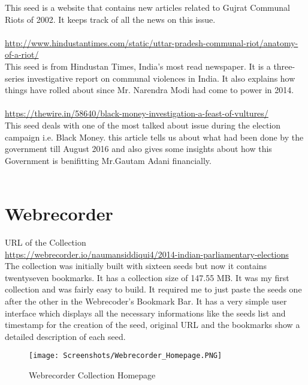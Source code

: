\documentclass[11pt,journal,compsoc,onecolumn]{IEEEtran}
\begin{document}
This seed is a website that contains new articles related to Gujrat Communal Riots of 2002. It keeps track of all the news on this issue.\\
\\
\url{http://www.hindustantimes.com/static/uttar-pradesh-communal-riot/anatomy-of-a-riot/}\\
This seed is from Hindustan Times, India's most read newspaper. It is a three- series investigative report on communal violences in India. It also explains how things have rolled about since Mr. Narendra Modi had come to power in 2014.\\
\\
\url{https://thewire.in/58640/black-money-investigation-a-feast-of-vultures/}\\
This seed deals with one of the most talked about issue during the election campaign i.e. Black Money. this article tells us about what had been done by the government till August 2016 and also gives some insights about how this Government is benifitting Mr.Gautam Adani financially.\\
\\
%
\section{Webrecorder}
URL of the Collection\\
\url{https://webrecorder.io/naumansiddiqui4/2014-indian-parliamentary-elections}\\
The collection was initially built with sixteen seeds but now it contains twentyseven bookmarks. It has a collection size of 147.55 MB. It was my first collection and was fairly easy to build. It required me to just paste the seeds one after the other in the Webrecoder's Bookmark Bar. It has a very simple user interface which displays all the necessary informations like the seeds list and timestamp for the creation of the seed, original URL and the bookmarks show a detailed description of each seed.
\begin{figure}[ht] 
  \centering
  \texttt{[image: Screenshots/Webrecorder\_Homepage.PNG]}
  \caption{Webrecorder Collection Homepage}
  \label{fig:1}
\end{figure}
\end{document}
